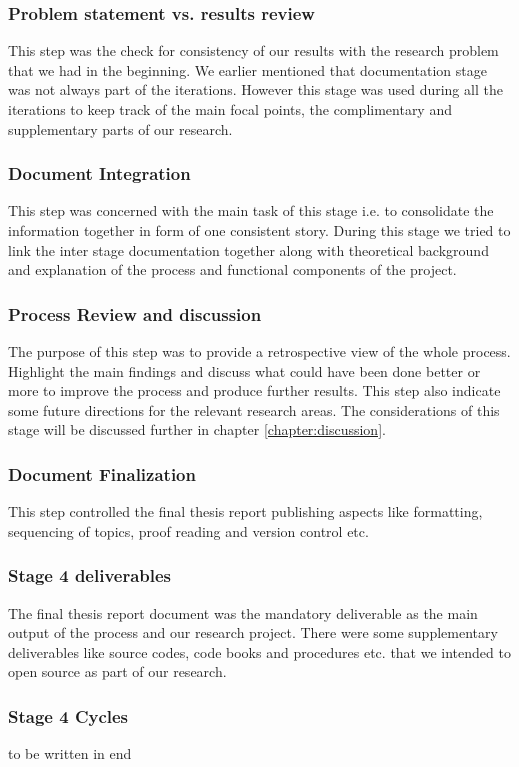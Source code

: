 \subsubsection{Problem statement vs. results review}\label{ps}
This step was the check for consistency of our results with the research problem that we had in the beginning. We earlier mentioned that documentation stage was not always part of the iterations. However this stage was used during all the iterations to keep track of the main focal points, the complimentary and supplementary parts of our research.    
\subsubsection{Document Integration}
This step was concerned with the main task of this stage i.e. to consolidate the information together in form of one consistent story. During this stage we tried to link the inter stage documentation together along with theoretical background and explanation of the process and functional components of the project.
\subsubsection{Process Review and discussion}
The purpose of this step was to provide a retrospective view of the whole process. Highlight the main findings and discuss what could have been done better or more to improve the process and produce further results. This step also indicate some future directions for the relevant research areas. The considerations of this stage will be discussed further in chapter \ref{chapter:discussion}.
\subsubsection{Document Finalization}
This step controlled the final thesis report publishing aspects like formatting, sequencing of topics, proof reading and version control etc.  
\subsubsection{Stage 4 deliverables}
The final thesis report document was the mandatory deliverable  as the main output of the process and our research project. There were some supplementary deliverables like source codes, code books and procedures etc. that we intended to open source as part of our research.   
\subsubsection{Stage 4 Cycles}
to be written in end

